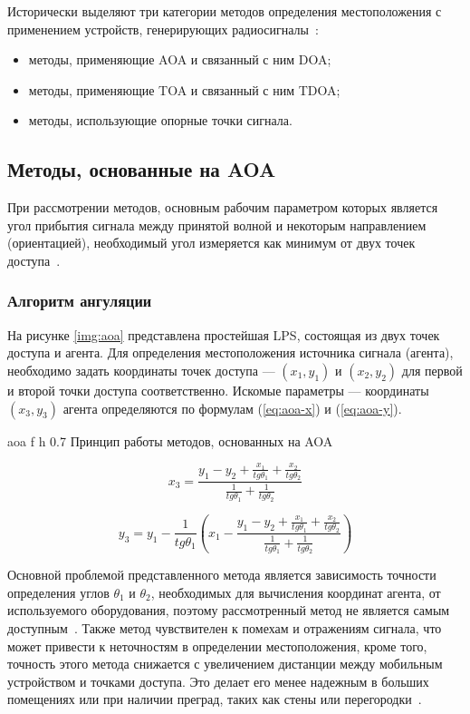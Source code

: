 Исторически выделяют три категории методов определения местоположения с применением устройств, генерирующих радиосигналы~\cite{wlan}:

\begin{itemize}[label=---]
    \item методы, применяющие AOA и связанный с ним DOA;
    \item методы, применяющие TOA и связанный с ним TDOA;
    \item методы, использующие опорные точки сигнала.
\end{itemize}

\subsection{Методы, основанные на AOA}

При рассмотрении методов, основным рабочим параметром которых является угол прибытия сигнала между принятой волной и некоторым направлением (ориентацией), необходимый угол измеряется как минимум от двух точек доступа~\cite{aoa}. 

\subsubsection{Алгоритм ангуляции}

На рисунке \ref{img:aoa} представлена простейшая LPS, состоящая из двух точек доступа и агента. Для определения местоположения источника сигнала (агента), необходимо задать координаты точек доступа --- $(x_1, y_1)$ и $(x_2, y_2)$ для первой и второй точки доступа соответственно. Искомые параметры --- координаты $(x_3, y_3)$ агента определяются по формулам (\ref{eq:aoa-x}) и (\ref{eq:aoa-y}).

    {aoa}
    {f}
    {h}
    {0.7\linewidth}
    {Принцип работы методов, основанных на AOA}

\begin{equation}
    x_3 = \frac{y_1 - y_2 + \frac{x_1}{tg\theta_1} + \frac{x_2}{tg\theta_2}}{\frac{1}{tg\theta_1} + \frac{1}{tg\theta_2}}
    \label{eq:aoa-x}
\end{equation}

\begin{equation}
    y_3 = y_1 - \frac{1}{tg\theta_1}\left(x_1 - \frac{y_1 - y_2 + \frac{x_1}{tg\theta_1} + \frac{x_2}{tg\theta_2}}{\frac{1}{tg\theta_1} + \frac{1}{tg\theta_2}}\right)
    \label{eq:aoa-y}
\end{equation}

Основной проблемой представленного метода является зависимость точности определения углов $\theta_1$ и $\theta_2$, необходимых для вычисления координат агента, от используемого оборудования, поэтому рассмотренный метод не является самым доступным~\cite{aoa-modern}. Также метод чувствителен к помехам и отражениям сигнала, что может привести к неточностям в определении местоположения, кроме того, точность этого метода снижается с увеличением дистанции между мобильным устройством и точками доступа. Это делает его менее надежным в больших помещениях или при наличии преград, таких как стены или перегородки~\cite{aoa}.

